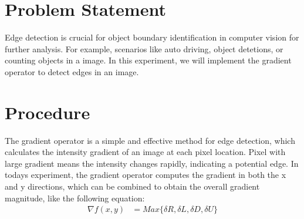 \documentclass[a4paper,11pt]{article}
\begin{document}
\thispagestyle{empty}

\blankpage

\tableofcontents
\blankpage

\section{Problem Statement}
Edge detection is crucial for object boundary identification in computer vision for further analysis. For example, scenarios like auto driving, object detetions, or counting objects in a image. In this experiment, we will implement the gradient operator to detect edges in an image.

\section{Procedure}
The gradient operator is a simple and effective method for edge detection, which calculates the intensity gradient of an image at each pixel location. Pixel with large gradient means the intensity changes rapidly, indicating a potential edge. 
In todays experiment, the gradient operator computes the gradient in both the x and y directions, which can be combined to obtain the overall gradient magnitude, like the following equation:
\begin{equation}
    \begin{aligned}
        \nabla f(x,y) &= Max \{ \delta R, \delta L, \delta D, \delta U\} \\
    \end{aligned}
\end{equation}
\end{document}
